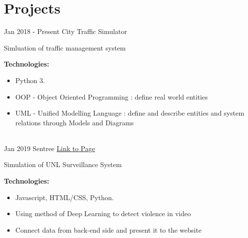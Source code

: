 \documentclass[letterpaper]{twentysecondcv} %
\begin{document}
\section{Projects}
\begin{twenty}
	\twentyitem
    	{Jan 2018 - }
		{Present}
        {City Traffic Simulator}
        {} %
        {}
        {
       	Simluation of traffic management system
       	
       	\textbf{Technologies:}
        {\begin{itemize}
        \item Python 3.
        \item OOP - Object Oriented Programming : define real world entities 
        \item UML - Unified Modelling Language : define and describe entities and system relations
        through Models and Diagrams
		\end{itemize}}
        }
    \\
        \twentyitem
    	{Jan 2019}
		{}
        {Sentree}
        {\href{https://datduyng.github.io/cornhack2019/}{Link to Page}} %
        {}
        {
       	Simulation of UNL Surveillance System
       	
       	\textbf{Technologies:}
        {\begin{itemize}
        \item Javascript, HTML/CSS, Python.
        \item Using method of Deep Learning to detect violence in video
        \item Connect data from back-end side and present it to the website
		\end{itemize}}
        }
        \\

\end{twenty}


\end{document}
